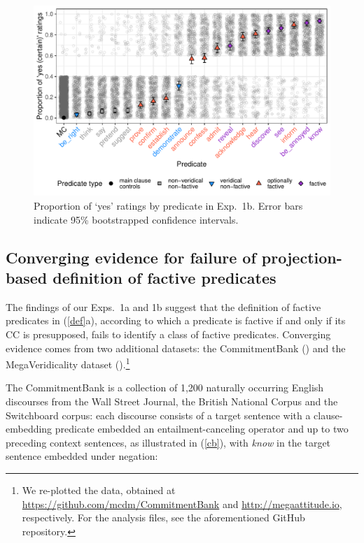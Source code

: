 \documentclass[11pt,fleqn]{article}
\newcommand{\6}{\mbox{$[\hspace*{-.6mm}[$}}
\newcommand{\9}{\mbox{$]\hspace*{-.6mm}]$}}
\begin{document}
\begin{figure}[H]

\centering
\includegraphics[width=.7\paperwidth]{../../results/8-projectivity-no-fact-binary/graphs/proportion-by-predicate-variability}
\caption{Proportion of `yes' ratings by predicate in Exp.~1b. Error bars indicate 95\% bootstrapped confidence intervals.}
\label{f-projectivity2}

\end{figure}


\subsection{Converging evidence for failure of projection-based definition of factive predicates}

The findings of our Exps.~1a and 1b suggest that the definition of factive predicates in (\ref{def}a), according to which a predicate is factive if and only if its CC is presupposed, fails to identify a class of factive predicates. Converging evidence comes from two additional datasets: the CommitmentBank (\citealt*{demarneffe-etal-sub23}) and the MegaVeridicality dataset (\citealt{white-rawlins-nels2018,white-etal2018b}).\footnote{We re-plotted the data, obtained at \url{https://github.com/mcdm/CommitmentBank} and \url{http://megaattitude.io}, respectively. For the analysis files, see the aforementioned GitHub repository.}

The CommitmentBank is a collection of 1,200 naturally occurring English discourses from the Wall Street Journal, the British National Corpus and the Switchboard corpus: each discourse consists of a target sentence with a clause-embedding predicate embedded an entailment-canceling operator and up to two preceding context sentences, as illustrated in (\ref{cb}), with {\em know} in the target sentence embedded under negation:
\end{document}
